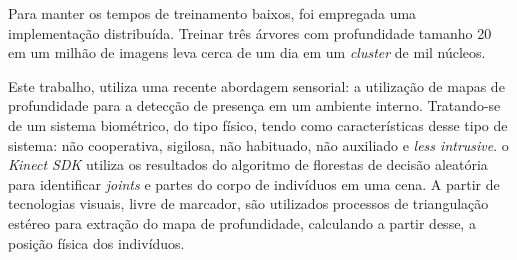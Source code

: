 Para manter os tempos de treinamento baixos, foi empregada uma implementação distribuída. Treinar três árvores com profundidade tamanho 20 em um milhão de imagens leva cerca de um dia em um \textit{cluster} de mil núcleos.

Este trabalho, utiliza uma recente abordagem sensorial: a utilização de mapas de profundidade para a detecção de presença em um ambiente interno. Tratando-se de um sistema biométrico, do tipo físico, tendo como características desse tipo de sistema: não cooperativa, sigilosa, não habituado, não auxiliado e \textit{less intrusive}. o \textit{Kinect SDK} utiliza os resultados do algoritmo de florestas de decisão aleatória para identificar \textit{joints} e partes do corpo de indivíduos em uma cena. A partir de tecnologias visuais, livre de marcador, são utilizados processos de triangulação estéreo para extração do mapa de profundidade, calculando a partir desse, a posição física dos indivíduos.